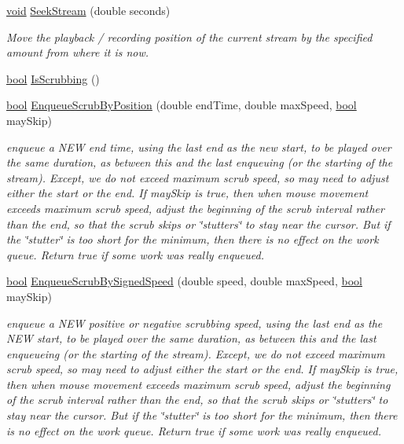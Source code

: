 \begin{DoxyCompactItemize}
\hyperlink{sound_8c_ae35f5844602719cf66324f4de2a658b3}{void} \hyperlink{class_audio_i_o_a40488ff8506e6238963049844728a6c6}{Seek\+Stream} (double seconds)
\begin{DoxyCompactList}\small\item\em Move the playback / recording position of the current stream by the specified amount from where it is now. \end{DoxyCompactList}\item 
\hyperlink{mac_2config_2i386_2lib-src_2libsoxr_2soxr-config_8h_abb452686968e48b67397da5f97445f5b}{bool} \hyperlink{class_audio_i_o_ada30edb1aa1b556aebb4ba0b9bbc697e}{Is\+Scrubbing} ()
\item 
\hyperlink{mac_2config_2i386_2lib-src_2libsoxr_2soxr-config_8h_abb452686968e48b67397da5f97445f5b}{bool} \hyperlink{class_audio_i_o_a89c8c6c8da819d583b92e32508fbae7b}{Enqueue\+Scrub\+By\+Position} (double end\+Time, double max\+Speed, \hyperlink{mac_2config_2i386_2lib-src_2libsoxr_2soxr-config_8h_abb452686968e48b67397da5f97445f5b}{bool} may\+Skip)
\begin{DoxyCompactList}\small\item\em enqueue a N\+EW end time, using the last end as the new start, to be played over the same duration, as between this and the last enqueuing (or the starting of the stream). Except, we do not exceed maximum scrub speed, so may need to adjust either the start or the end. If may\+Skip is true, then when mouse movement exceeds maximum scrub speed, adjust the beginning of the scrub interval rather than the end, so that the scrub skips or \char`\"{}stutters\char`\"{} to stay near the cursor. But if the \char`\"{}stutter\char`\"{} is too short for the minimum, then there is no effect on the work queue. Return true if some work was really enqueued. \end{DoxyCompactList}\item 
\hyperlink{mac_2config_2i386_2lib-src_2libsoxr_2soxr-config_8h_abb452686968e48b67397da5f97445f5b}{bool} \hyperlink{class_audio_i_o_aa5680009162f44b9156622851767e328}{Enqueue\+Scrub\+By\+Signed\+Speed} (double speed, double max\+Speed, \hyperlink{mac_2config_2i386_2lib-src_2libsoxr_2soxr-config_8h_abb452686968e48b67397da5f97445f5b}{bool} may\+Skip)
\begin{DoxyCompactList}\small\item\em enqueue a N\+EW positive or negative scrubbing speed, using the last end as the N\+EW start, to be played over the same duration, as between this and the last enqueueing (or the starting of the stream). Except, we do not exceed maximum scrub speed, so may need to adjust either the start or the end. If may\+Skip is true, then when mouse movement exceeds maximum scrub speed, adjust the beginning of the scrub interval rather than the end, so that the scrub skips or \char`\"{}stutters\char`\"{} to stay near the cursor. But if the \char`\"{}stutter\char`\"{} is too short for the minimum, then there is no effect on the work queue. Return true if some work was really enqueued. \end{DoxyCompactList}\item 

\end{DoxyCompactItemize}
